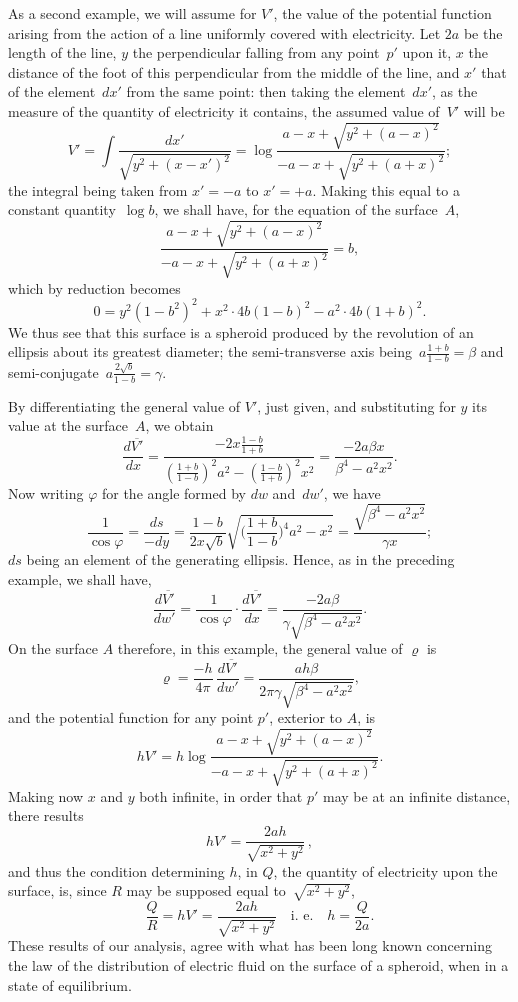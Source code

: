 \documentclass[11pt,notitlepage]{amsart}
\renewcommand{\rho}{\varrho}
\renewcommand{\phi}{\varphi}
\begin{document}
As a second example, we will assume for $V'$, the value of the potential
function arising from the action of a line uniformly covered with electricity.
Let $2a$ be the length of the line, $y$ the perpendicular falling from any
point~$p'$ upon it, $x$ the distance of the foot of this perpendicular from the
middle of the line, and $x'$ that of the element~$dx'$ from the same point: then
taking the element~$dx'$, as the measure of the quantity of electricity it 
contains, the assumed value of~$V'$ will be
\[
V'=\int\frac{dx'}{\sqrt{y^2+(x-x')^2}}
=\log\frac{a-x+\sqrt{y^2+(a-x)^2}}{-a-x+\sqrt{y^2+(a+x)^2}};
\]
the integral being taken from $x'=-a$ to $x'=+a$. Making this equal to
a constant quantity~$\log b$, we shall have,
for the equation of the surface~$A$,
\[
\frac{a-x+\sqrt{y^2+(a-x)^2}}{-a-x+\sqrt{y^2+(a+x)^2}}=b,
\]
which by reduction becomes
\[
0=y^2(1-b^2)^2+x^2\cdot 4b(1-b)^2-a^2\cdot 4b(1+b)^2.
\]
We thus see that this surface is a spheroid produced by the revolution of an
ellipsis about its greatest diameter;
the semi-transverse axis being~${a\frac{1+b}{1-b}=\beta}$
and semi-conjugate~${a\frac{2\sqrt b}{1-b}=\gamma}$.

By differentiating the general value of $V'$, just given, and substituting
for $y$ its value at the surface~$A$, we obtain
\[
\frac{d\overline{V'}}{dx}
=\frac{-2x\frac{1-b}{1+b}}{(\frac{1+b}{1-b})^2a^2-(\frac{1-b}{1+b})^2x^2}
=\frac{-2a\beta x}{\beta^4-a^2x^2}.
\]
Now writing $\phi$ for the angle formed by $dw$ and~$dw'$, we have
\[
\frac{1}{\cos\phi}=\frac{ds}{-dy}
=\frac{1-b}{2x\sqrt b}\sqrt{\biggl(\frac{1+b}{1-b}\biggr)^4a^2-x^2}
=\frac{\sqrt{\beta^4-a^2x^2}}{\gamma x};
\]
$ds$ being an element of the generating ellipsis. Hence, as in the preceding
example, we shall have,
\[
\frac{d\overline{V'}}{dw'}=\frac{1}{\cos\phi}\cdot\frac{d\overline{V'}}{dx}
=\frac{-2a\beta}{\gamma\sqrt{\beta^4-a^2x^2}}.
\]
On the surface $A$ therefore, in this example, the general value of $\rho$ is
\[
\rho=\frac{-h}{4\pi}\,\frac{d\overline{V'}}{dw'}
=\frac{ah\beta}{2\pi\gamma\sqrt{\beta^4-a^2x^2}},
\]
and the potential function for any point $p'$, exterior to $A$, is
\[
hV'=h\log\frac{a-x+\sqrt{y^2+(a-x)^2}}{-a-x+\sqrt{y^2+(a+x)^2}}.
\]
Making now $x$ and $y$ both infinite, in order that $p'$ may be at an infinite
distance, there results
\[
hV'=\frac{2ah}{\sqrt{x^2+y^2}}\,,
\]
and thus the condition determining $h$, in $Q$, the quantity of electricity upon
the surface, is, since $R$ may be supposed equal to~$\sqrt{x^2+y^2}$,
\[
\frac QR=hV'=\frac{2ah}{\sqrt{x^2+y^2}}
\quad\text{i.~e.}\quad
h=\frac{Q}{2a}.
\]
These results of our analysis, agree with what has been long known concerning
the law of the distribution of electric fluid on the surface of a spheroid,
when in a state of equilibrium.
\bigskip
\end{document}

